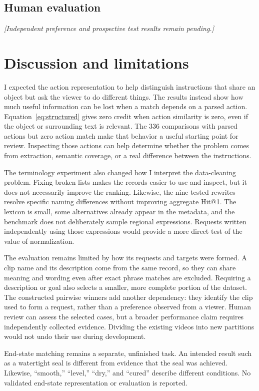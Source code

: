 \documentclass[11pt,letterpaper]{article}
\newcommand{\pending}[1]{\par\noindent\textit{[#1]}\par\vspace{0.6em}}
\begin{document}
\subsection{Human evaluation}
\HumanReviewResults

\pending{Independent preference and prospective test results remain pending.}

\section{Discussion and limitations}
I expected the action representation to help distinguish instructions that
share an object but ask the viewer to do different things. The results instead
show how much useful information can be lost when a match depends on a parsed
action. Equation~\ref{eq:structured} gives zero credit when action similarity
is zero, even if the object or surrounding text is relevant. The 336 comparisons
with parsed actions but zero action match make that behavior a useful starting
point for review. Inspecting those actions can help determine whether the
problem comes from extraction, semantic coverage, or a real difference between
the instructions.

The terminology experiment also changed how I interpret the data-cleaning
problem. Fixing broken lists makes the records easier to use and inspect,
but it does not necessarily improve the ranking. Likewise, the nine tested
rewrites resolve specific naming differences without improving aggregate
Hit@1. The lexicon is small, some alternatives already appear in the metadata,
and the benchmark does not deliberately sample regional expressions. Requests
written independently using those expressions would provide a more direct
test of the value of normalization.

The evaluation remains limited by how its requests and targets were formed.
A clip name and its description come from the same record, so they can share
meaning and wording even after exact phrase matches are excluded. Requiring
a description or goal also selects a smaller, more complete portion of the
dataset. The constructed pairwise winners add another dependency: they identify
the clip used to form a request, rather than a preference observed from a viewer.
Human review can assess the selected cases, but a broader performance claim
requires independently collected evidence. Dividing the existing videos into
new partitions would not undo their use during development.

End-state matching remains a separate, unfinished task. An intended result
such as a watertight seal is different from evidence that the seal was achieved.
Likewise, ``smooth,'' ``level,'' ``dry,'' and ``cured'' describe different
conditions. No validated end-state representation or evaluation is reported.
\end{document}
